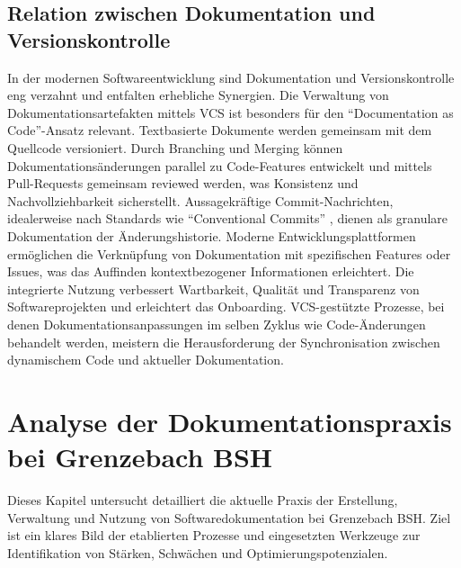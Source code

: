 \documentclass[12pt,oneside]{article}
\begin{document}
    \subsection{Relation zwischen Dokumentation und Versionskontrolle}
    \label{subsec:relation}
    In der modernen Softwareentwicklung sind Dokumentation und Versionskontrolle eng verzahnt und entfalten erhebliche Synergien. Die Verwaltung von Dokumentationsartefakten mittels VCS ist besonders für den ``Documentation as Code''-Ansatz relevant. Textbasierte Dokumente werden gemeinsam mit dem Quellcode versioniert. Durch Branching und Merging können Dokumentationsänderungen parallel zu Code-Features entwickelt und mittels Pull-Requests gemeinsam reviewed werden, was Konsistenz und Nachvollziehbarkeit sicherstellt.
    \newline
    Aussagekräftige Commit-Nachrichten, idealerweise nach Standards wie ``Conventional Commits'' \cite{ConventionalCommitsOrgDe}, dienen als granulare Dokumentation der Änderungshistorie. Moderne Entwicklungsplattformen ermöglichen die Verknüpfung von Dokumentation mit spezifischen Features oder Issues, was das Auffinden kontextbezogener Informationen erleichtert.
    \newline
    Die integrierte Nutzung verbessert Wartbarkeit, Qualität und Transparenz von Softwareprojekten und erleichtert das Onboarding. VCS-gestützte Prozesse, bei denen Dokumentationsanpassungen im selben Zyklus wie Code-Änderungen behandelt werden, meistern die Herausforderung der Synchronisation zwischen dynamischem Code und aktueller Dokumentation.




    \section{Analyse der Dokumentationspraxis bei Grenzebach BSH}
    \label{sec:analyse_dokumentation}
    Dieses Kapitel untersucht detailliert die aktuelle Praxis der Erstellung, Verwaltung und Nutzung von Softwaredokumentation bei Grenzebach BSH. Ziel ist ein klares Bild der etablierten Prozesse und eingesetzten Werkzeuge zur Identifikation von Stärken, Schwächen und Optimierungspotenzialen.
\end{document}
